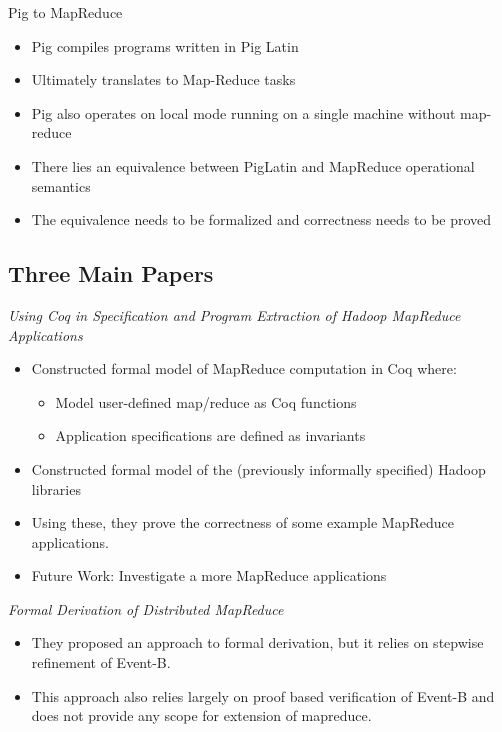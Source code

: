 \begin{frame}{Pig to MapReduce}
\begin{itemize}
	\item Pig compiles programs written in Pig Latin
	\item Ultimately translates to Map-Reduce tasks
	\item Pig also operates on local mode running on a single machine without
          map-reduce
	\item There lies an equivalence between PigLatin and MapReduce operational
          semantics
	\item The equivalence needs to be formalized and correctness needs to be
          proved
\end{itemize}
\end{frame}


\subsection{Three Main Papers}

\begin{frame}{\citet[SEFM]{ono2011using}}
\emph{Using Coq in Specification and Program Extraction of Hadoop MapReduce
Applications}
\begin{itemize}
    \item Constructed formal model of MapReduce computation in Coq where:
    \begin{itemize}
        \item Model user-defined map/reduce as Coq functions
        \item Application specifications are defined as invariants
    \end{itemize}
	\item Constructed formal model of the (previously informally specified)
          Hadoop libraries
	\item Using these, they prove the correctness of some example MapReduce
          applications.
    \item Future Work: Investigate a more MapReduce applications
\end{itemize}
\end{frame}

\begin{frame}{\citet[ABZ][]{pereverzeva2014formal}}
\emph{Formal Derivation of Distributed MapReduce}
\begin{itemize}
	\item They proposed an approach to formal derivation, but it relies on
          stepwise refinement of Event-B.
	\item This approach also relies largely on proof based verification of
          Event-B and does not provide any scope for extension of mapreduce.
\end{itemize}
\end{frame}

